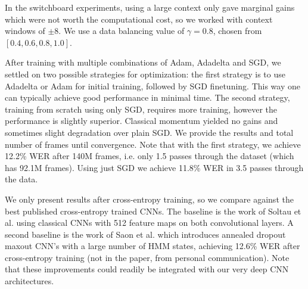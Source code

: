 \documentclass{article}
\begin{document}
In the switchboard experiments, using a large context only gave marginal gains
which were not worth the computational cost,
so we worked with context windows of $\pm$8.
We use a data balancing value of $\gamma=0.8$, 
chosen from $[0.4,0.6,0.8,1.0]$.

After training with multiple combinations of Adam, Adadelta and SGD,
we settled on two possible strategies for optimization: the first strategy is to
use Adadelta or Adam for initial training,
followed by SGD finetuning. This way one can typically achieve good performance in minimal time.
The second strategy, training from scratch using only SGD, requires more training, 
however the performance is slightly superior.
Classical momentum yielded no gains and sometimes slight degradation over plain SGD.
We provide the results and total number of frames until convergence. 
Note that with the first strategy, we achieve 12.2\% WER
after 140M frames, i.e. only 1.5 passes through the dataset (which has 92.1M frames).
Using just SGD we achieve 11.8\% WER in 3.5 passes through the data.

We only present results after cross-entropy training, so we compare against
the best published cross-entropy trained CNNs.
The baseline is the work of Soltau et al. \cite{soltau2014joint} using
classical CNNs with 512 feature maps on both convolutional layers.
A second baseline is the work of Saon et al. \cite{saon2015ibm} which introduces
annealed dropout maxout CNN's with a large number of HMM states, achieving
12.6\% WER after cross-entropy training (not in the paper, from personal communication).
Note that these improvements could readily be integrated with our very deep CNN architectures.
\end{document}
